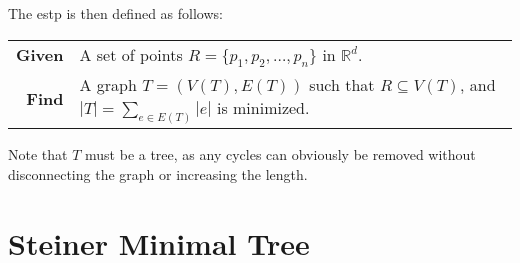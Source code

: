 The \ac{estp} is then defined as follows:
%
\begin{center}
  \begin{tabular}{rp{9cm}}
    \toprule
    \textbf{Given} & A set of points $R = \{ p_1, p_2, \ldots, p_n \}$ in
                     $\mathbb{R}^d$. \\
    \textbf{Find} & A graph $T = (V(T), E(T))$ such that $R \subseteq V(T)$, and
                    $|T| = \sum_{e \in E(T)} |e|$ is minimized. \\
    \bottomrule
  \end{tabular}
\end{center}
%
Note that $T$ must be a tree, as any cycles can obviously be removed
without disconnecting the graph or increasing the length.

\section{Steiner Minimal Tree}
\label{sec:steiner-minimal-tree}

